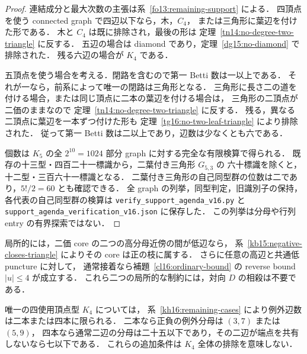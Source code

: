 \begin{proof}
連結成分と最大次数の主張は系~\ref{fo13:remaining-support} による．
四頂点を使う connected graph で四辺以下なら，木，$C_4$，
または三角形に葉辺を付けた形である．
木と $C_4$ は既に排除され，最後の形は
定理~\ref{tn14:no-degree-two-triangle} に反する．
五辺の場合は diamond であり，定理~\ref{dg15:no-diamond} で排除された．
残る六辺の場合が $K_4$ である．

五頂点を使う場合を考える．閉路を含むので第一 Betti 数は一以上である．
それが一なら，前系によって唯一の閉路は三角形となる．
三角形に長さ二の道を付ける場合，または同じ頂点に二本の葉辺を付ける場合は，
三角形の二頂点が二価のままなので
定理~\ref{tn14:no-degree-two-triangle} に反する．
残る，異なる二頂点に葉辺を一本ずつ付けた形も
定理~\ref{tg16:no-two-leaf-triangle} により排除された．
従って第一 Betti 数は二以上であり，辺数は少なくとも六である．

個数は $K_5$ の全 $2^{10}=1024$ 部分 graph に対する完全な有限検算で得られる．
既存の十三型・四百二十一標識から，二葉付き三角形 $G_{5,3}$ の
六十標識を除くと，十二型・三百六十一標識となる．
二葉付き三角形の自己同型群の位数は二であり，$5!/2=60$ とも確認できる．
全 graph の列挙，同型判定，旧識別子の保持，各代表の自己同型群の検算は
\nolinkurl{verify_support_agenda_v16.py} と
\nolinkurl{support_agenda_verification_v16.json} に保存した．
この列挙は分母や行列 entry の有界探索ではない．
\end{proof}

局所的には，二価 core の二つの高分母近傍の間が低辺なら，
系~\ref{kb15:negative-closes-triangle} によりその core は正の枝に属する．
さらに任意の高辺と共通低 puncture に対して，
通常接着なら補題~\ref{cl16:ordinary-bound} の reverse bound $|u|\le4$ が成立する．
これら二つの局所的な制約には，対向 $D$ の相殺は不要である．

唯一の四使用頂点型 $K_4$ については，
系~\ref{kh16:remaining-cases} により例外辺数は二本または四本に限られる．
二本なら正負の例外分母は $(3,7)$ または $(5,9)$，
四本なら通常二辺の分母は二十五以下であり，その二辺が端点を共有しないなら七以下である．
これらの追加条件は $K_4$ 全体の排除を意味しない．
